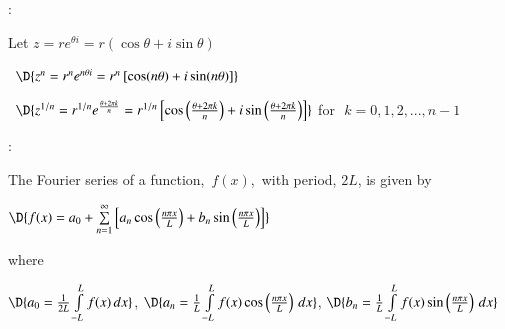 \documentclass[11pt]{article}
\begin{document}
\vspace{0.2cm}

:

Let $z = re^{\theta i} = r(\cos \theta + i\sin \theta)$

\qquad \, $\D{z^n = r^ne^{n\theta i} = r^n\left[\cos (n\theta) + i\sin (n\theta)\right]}$

\qquad \, $\D{z^{1/n} = r^{1/n}e^{\frac{\theta+2\pi k}{n}} = r^{1/n}\left[\cos \left(\frac{\theta+2\pi k}{n}\right) + i\sin \left(\frac{\theta+2\pi k}{n}\right)\right]}$ \quad for \,\,$k=0,1,2,...,n-1$

\vspace{0.1cm}

:	
	 
The Fourier series of a function, \,$f(x)$, \,with period, $2L$, is given by
\begin{center}
	$\D{f(x) = a_0 + \sum \limits_{n=1}^{\infty} \left[a_n\cos\left(\frac{n\pi x}{L}\right) + b_n \sin\left(\frac{n\pi x}{L}\right)\right]}$
\end{center}
where
\begin{center}
	$\D{a_0 = \frac{1}{2L}\int \limits_{-L}^{L} f(x)\, dx}$, \qquad 
	$\D{a_n = \frac{1}{L}\int \limits_{-L}^{L} f(x) \cos\left(\frac{n\pi x}{L}\right)\, dx}$, \qquad
	$\D{b_n = \frac{1}{L}\int \limits_{-L}^{L} f(x) \sin\left(\frac{n\pi x}{L}\right)\, dx}$
\end{center}
\end{document}
